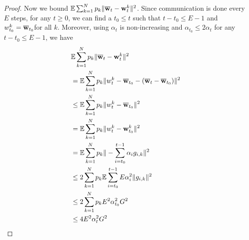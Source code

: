 \begin{proof}
	Now we bound $\mathbb{E}\sum_{k=1}^{N}p_{k}\|{\overline{\mathbf{w}}}_{t}-{\mathbf{w}}_{t}^{k}\|^{2}$.
	Since communication is done every $E$ steps, for any $t\geq0$, we
	can find a $t_{0}\leq t$ such that $t-t_{0}\leq E-1$ and $w_{t_{0}}^{k}={\overline{\mathbf{w}}}_{t_{0}}$for
	all $k$. Moreover, using $\alpha_{t}$ is non-increasing and $\alpha_{t_{0}}\leq2\alpha{}_{t}$
	for any $t-t_{0}\leq E-1$, we have 
	\begin{align*}
	& \mathbb{E}\sum_{k=1}^{N}p_{k}\|{\overline{\mathbf{w}}}_{t}-{\mathbf{w}}_{t}^{k}\|^{2}\\
	& =\mathbb{E}\sum_{k=1}^{N}p_{k}\|w_{t}^{k}-{\overline{\mathbf{w}}}_{t_{0}}-({\overline{\mathbf{w}}}_{t}-{\overline{\mathbf{w}}}_{t_{0}})\|^{2}\\
	& \leq\mathbb{E}\sum_{k=1}^{N}p_{k}\|w_{t}^{k}-{\overline{\mathbf{w}}}_{t_{0}}\|^{2}\\
	& =\mathbb{E}\sum_{k=1}^{N}p_{k}\|w_{t}^{k}-{\mathbf{w}}_{t_{0}}^{k}\|^{2}\\
	& =\mathbb{E}\sum_{k=1}^{N}p_{k}\|-\sum_{i=t_{0}}^{t-1}\alpha_{i}g_{i,k}\|^{2}\\
	& \leq2\sum_{k=1}^{N}p_{k}\mathbb{E}\sum_{i=t_{0}}^{t-1}E\alpha_{i}^{2}\|g_{i,k}\|^{2}\\
	& \leq2\sum_{k=1}^{N}p_{k}E^{2}\alpha_{t_{0}}^{2}G^{2}\\
	& \leq4E^{2}\alpha_{t}^{2}G^{2}
	\end{align*}
	\begin{comment}
	Alternatively, we can also write
	\begin{align*}
	\sum_{k=1}^{N}p_{k}\|\ov{w}_{t}-\vw_{t}^{k}\|^{2} & =\sum_{k=1}^{N}p_{k}\|\ov{w}_{t-1}-\alpha_{t-1}g_{t-1}-\vw_{t-1}^{k}+\alpha_{t-1}g_{t-1,k}\|^{2}\\
	& \leq2\sum_{k=1}^{N}p_{k}\left(\|\ov{w}_{t-1}-\vw_{t-1}^{k}\|^{2}+\|\alpha_{t-1}g_{t-1}-\alpha_{t-1}g_{t-1,k}\|^{2}\right)
	\end{align*}
	and write 
	\begin{align*}
	\sum_{k}p_{k}\|g_{t-1,k}-g_{t-1}\|^{2}\leq\sum_{k}p_{k}\|g_{t-1,k}\|^{2} & =\sum_{k}p_{k}\|g_{t-1,k}-\nabla F_{k}(\vw_{t-1}^{k})+\nabla F_{k}(\vw_{t-1}^{k})\|^{2}\\
	& \leq2\sum_{k}p_{k}\|g_{t-1,k}-\nabla F_{k}(\vw_{t-1}^{k})\|^{2}+2\sum_{k}p_{k}\|\nabla F_{k}(\vw_{t-1}^{k})\|^{2}\\
	& \leq2\sum_{k}p_{k}\sigma_{k}^{2}+2\sum_{k}p_{k}\|\nabla F_{k}(\vw_{t-1}^{k})-\nabla F_{k}(\ov{w}_{t-1})+\nabla F_{k}(\ov{w}_{t-1})\|^{2}\\
	& \leq2\sum_{k}p_{k}\sigma_{k}^{2}+4\sum_{k}p_{k}\left(\|\nabla F_{k}(\vw_{t-1}^{k})-\nabla F_{k}(\ov{w}_{t-1})\|^{2}+\|\nabla F_{k}(\ov{w}_{t-1})\|^{2}\right)\\

\end{comment}
\end{proof}
